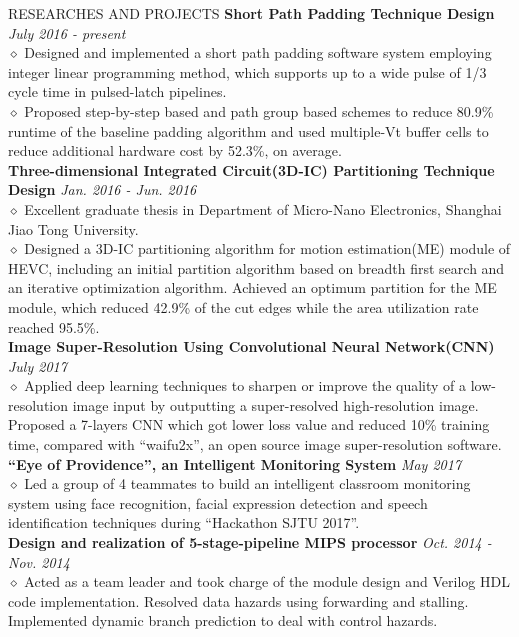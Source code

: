 \documentclass{resume} %
\begin{document}
\begin{rSection}{RESEARCHES AND PROJECTS}
\textbf{Short Path Padding Technique Design} \hfill \emph{July 2016 - present}
\\$\diamond$ Designed and implemented a short path padding software system employing integer linear programming method, which supports up to a wide pulse of 1/3 cycle time in pulsed-latch pipelines.
\\$\diamond$ Proposed step-by-step based and path group based schemes to reduce 80.9\% runtime of the baseline padding algorithm and used multiple-Vt buffer cells to reduce additional hardware cost by 52.3\%, on average. 
\\\textbf{Three-dimensional Integrated Circuit(3D-IC) Partitioning Technique Design} \hfill \emph{Jan. 2016 - Jun. 2016}
\\$\diamond$ Excellent graduate thesis in Department of Micro-Nano Electronics, Shanghai Jiao Tong University.
\\$\diamond$ Designed a 3D-IC partitioning algorithm for motion estimation(ME) module of HEVC, including an initial partition algorithm based on breadth first search and an iterative optimization algorithm. Achieved an optimum partition for the ME module, which reduced 42.9\% of the cut edges while the area utilization rate reached 95.5\%.
\\\textbf{Image Super-Resolution Using Convolutional Neural Network(CNN)} \hfill \emph{July 2017}
\\$\diamond$  Applied deep learning techniques to sharpen or improve the quality of a low-resolution image input by outputting a super-resolved high-resolution image. Proposed a 7-layers CNN which got lower loss value and reduced 10\% training time, compared with ``waifu2x'', an open source image super-resolution software.
\\\textbf{``Eye of Providence'', an Intelligent Monitoring System} \hfill \emph{May 2017}
\\$\diamond$ Led a group of 4 teammates to build an intelligent classroom monitoring system using face recognition, facial expression detection and speech identification techniques during ``Hackathon SJTU 2017''.
\\\textbf{Design and realization of 5-stage-pipeline MIPS processor} \hfill \emph{Oct. 2014 - Nov. 2014}
\\$\diamond$  Acted as a team leader and took charge of the module design and Verilog HDL code implementation. Resolved data hazards using forwarding and stalling. Implemented dynamic branch prediction to deal with control hazards.
\end{rSection}
\end{document}
